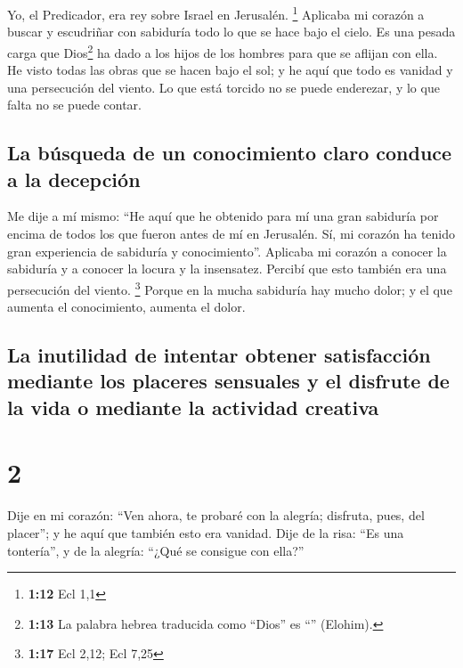  Yo, el Predicador, era rey sobre Israel en Jerusalén.
\footnote{\textbf{1:12} Ecl 1,1}  Aplicaba mi corazón a
buscar y escudriñar con sabiduría todo lo que se hace bajo el cielo. Es
una pesada carga que Dios\footnote{\textbf{1:13} La palabra hebrea
  traducida como ``Dios'' es ``'' (Elohim).} ha dado a los
hijos de los hombres para que se aflijan con ella.  He
visto todas las obras que se hacen bajo el sol; y he aquí que todo es
vanidad y una persecución del viento.  Lo que está
torcido no se puede enderezar, y lo que falta no se puede contar.

\hypertarget{la-buxfasqueda-de-un-conocimiento-claro-conduce-a-la-decepciuxf3n}{%
\subsection{La búsqueda de un conocimiento claro conduce a la
decepción}\label{la-buxfasqueda-de-un-conocimiento-claro-conduce-a-la-decepciuxf3n}}

 Me dije a mí mismo: ``He aquí que he obtenido para mí
una gran sabiduría por encima de todos los que fueron antes de mí en
Jerusalén. Sí, mi corazón ha tenido gran experiencia de sabiduría y
conocimiento''.  Aplicaba mi corazón a conocer la
sabiduría y a conocer la locura y la insensatez. Percibí que esto
también era una persecución del viento. \footnote{\textbf{1:17} Ecl
  2,12; Ecl 7,25}  Porque en la mucha sabiduría hay mucho
dolor; y el que aumenta el conocimiento, aumenta el dolor.

\hypertarget{la-inutilidad-de-intentar-obtener-satisfacciuxf3n-mediante-los-placeres-sensuales-y-el-disfrute-de-la-vida-o-mediante-la-actividad-creativa}{%
\subsection{La inutilidad de intentar obtener satisfacción mediante los
placeres sensuales y el disfrute de la vida o mediante la actividad
creativa}\label{la-inutilidad-de-intentar-obtener-satisfacciuxf3n-mediante-los-placeres-sensuales-y-el-disfrute-de-la-vida-o-mediante-la-actividad-creativa}}

\hypertarget{section-1}{%
\section{2}\label{section-1}}

 Dije en mi corazón: ``Ven ahora, te probaré con la
alegría; disfruta, pues, del placer''; y he aquí que también esto era
vanidad.  Dije de la risa: ``Es una tontería'', y de la
alegría: ``¿Qué se consigue con ella?''

